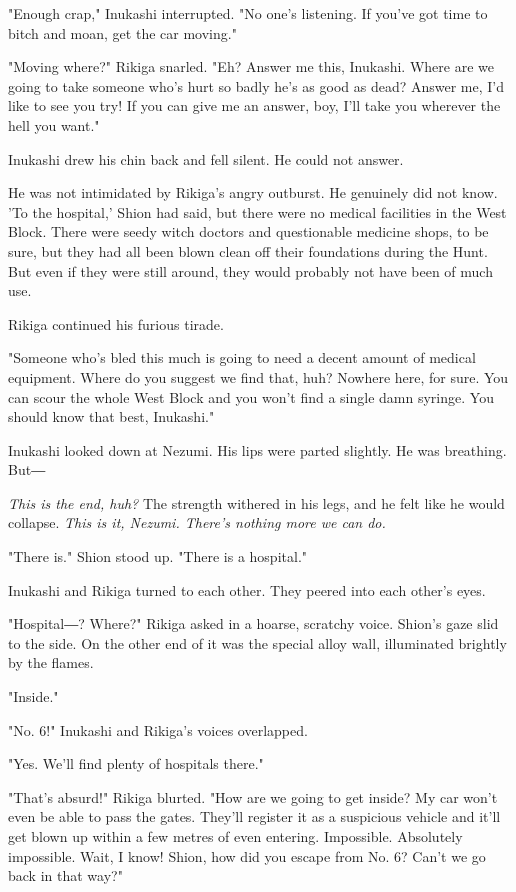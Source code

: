 "Enough crap," Inukashi interrupted. "No one's listening. If you've got
time to bitch and moan, get the car moving."

"Moving where?" Rikiga snarled. "Eh? Answer me this, Inukashi. Where are
we going to take someone who's hurt so badly he's as good as dead?
Answer me, I'd like to see you try! If you can give me an answer, boy,
I'll take you wherever the hell you want."

Inukashi drew his chin back and fell silent. He could not answer.

He was not intimidated by Rikiga's angry outburst. He genuinely did not
know. 'To the hospital,' Shion had said, but there were no medical
facilities in the West Block. There were seedy witch doctors and
questionable medicine shops, to be sure, but they had all been blown
clean off their foundations during the Hunt. But even if they were still
around, they would probably not have been of much use.

Rikiga continued his furious tirade.

"Someone who's bled this much is going to need a decent amount of
medical equipment. Where do you suggest we find that, huh? Nowhere here,
for sure. You can scour the whole West Block and you won't find a single
damn syringe. You should know that best, Inukashi."

Inukashi looked down at Nezumi. His lips were parted slightly. He was
breathing. But―

\emph{This is the end, huh?} The strength withered in his legs, and he felt
like he would collapse. \emph{This is it, Nezumi. There's nothing more we can
do.}

\mybreak

"There is." Shion stood up. "There is a hospital."

Inukashi and Rikiga turned to each other. They peered into each other's
eyes.

"Hospital―? Where?" Rikiga asked in a hoarse, scratchy voice. Shion's
gaze slid to the side. On the other end of it was the special alloy
wall, illuminated brightly by the flames.

"Inside."

"No. 6!" Inukashi and Rikiga's voices overlapped.

"Yes. We'll find plenty of hospitals there."

"That's absurd!" Rikiga blurted. "How are we going to get inside? My car
won't even be able to pass the gates. They'll register it as a
suspicious vehicle and it'll get blown up within a few metres of even
entering. Impossible. Absolutely impossible. Wait, I know! Shion, how
did you escape from No. 6? Can't we go back in that way?"

